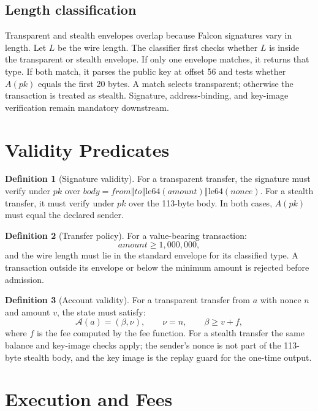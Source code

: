 \documentclass[11pt,a4paper]{article}
\theoremstyle{definition}
\newtheorem{definition}{Definition}[section]
\theoremstyle{plain}
\newcommand{\concat}{\mathbin{\Vert}}
\begin{document}
\subsection{Length classification}

Transparent and stealth envelopes overlap because Falcon signatures vary in
length. Let $L$ be the wire length. The classifier first checks whether $L$ is
inside the transparent or stealth envelope. If only one envelope matches, it
returns that type. If both match, it parses the public key at offset 56 and
tests whether $A(pk)$ equals the first 20 bytes. A match selects transparent;
otherwise the transaction is treated as stealth. Signature, address-binding,
and key-image verification remain mandatory downstream.

\section{Validity Predicates}

\begin{definition}[Signature validity]
For a transparent transfer, the signature must verify under $pk$ over
$body=from\concat to\concat \mathrm{le64}(amount)\concat
\mathrm{le64}(nonce)$. For a stealth transfer, it must verify under $pk$ over
the 113-byte body. In both cases, $A(pk)$ must equal the declared sender.
\end{definition}

\begin{definition}[Transfer policy]
For a value-bearing transaction:
\[
  amount \ge 1{,}000{,}000,
\]
and the wire length must lie in the standard envelope for its classified
type. A transaction outside its envelope or below the minimum amount is
rejected before admission.
\end{definition}

\begin{definition}[Account validity]
For a transparent transfer from $a$ with nonce $n$ and amount $v$, the state
must satisfy:
\[
  \mathcal{A}(a)=(\beta,\nu),\qquad \nu=n,\qquad \beta\ge v+f,
\]
where $f$ is the fee computed by the fee function. For a stealth transfer the
same balance and key-image checks apply; the sender's nonce is not part of the
113-byte stealth body, and the key image is the replay guard for the one-time
output.
\end{definition}

\section{Execution and Fees}
\end{document}

